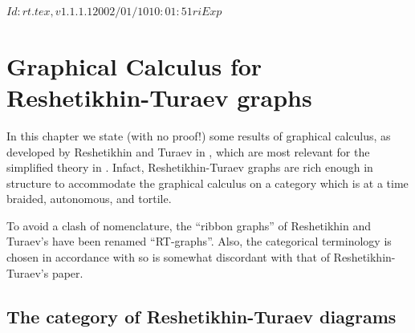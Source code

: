 \RCSID $Id: rt.tex,v 1.1.1.1 2002/01/10 10:01:51 ri Exp $


\chapter{Graphical Calculus for Reshetikhin-Turaev graphs}
\label{cha:rt}

In this chapter we state (with no proof!) some results of graphical
calculus, as developed by Reshetikhin and Turaev in
\cite{reshetikhin-turaev;ribbon-graphs}, which are most relevant for
the simplified theory in . Infact, Reshetikhin-Turaev
graphs are rich enough in structure to accommodate the graphical
calculus on a category which is at a time braided, autonomous, and
tortile.

To avoid a clash of nomenclature, the ``ribbon graphs'' of Reshetikhin
and Turaev's \cite{reshetikhin-turaev;ribbon-graphs} have been renamed
``RT-graphs''. Also, the categorical terminology is chosen in
accordance with  so is somewhat discordant with that of
Reshetikhin-Turaev's paper.

\section{The category of Reshetikhin-Turaev diagrams} 
\label{sec:rt-diagrams}

